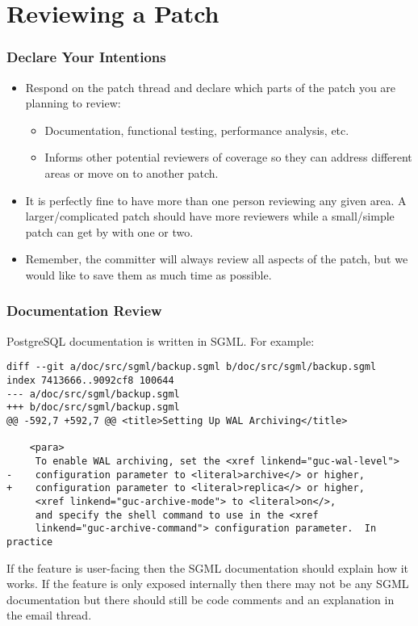 \section{Reviewing a Patch}

\begin{frame}
    \frametitle{Declare Your Intentions}

    \begin{itemize}
        \item Respond on the patch thread and declare which parts of the patch you are planning to review:

        \begin{itemize}
            \item Documentation, functional testing, performance analysis, etc.\pause
            \item Informs other potential reviewers of coverage so they can address different areas or move on to another patch.\pause
        \end{itemize}

        \item It is perfectly fine to have more than one person reviewing any given area.  A larger/complicated patch should have more reviewers while a small/simple patch can get by with one or two.\pause

        \item Remember, the committer will always review all aspects of the patch, but we would like to save them as much time as possible.
    \end{itemize}
\end{frame}

\begin{frame}[fragile]
    \frametitle{Documentation Review}

    PostgreSQL documentation is written in SGML. For example:
    \vspace{1em}

    \begin{lstlisting}
diff --git a/doc/src/sgml/backup.sgml b/doc/src/sgml/backup.sgml
index 7413666..9092cf8 100644
--- a/doc/src/sgml/backup.sgml
+++ b/doc/src/sgml/backup.sgml
@@ -592,7 +592,7 @@ <title>Setting Up WAL Archiving</title>

    <para>
     To enable WAL archiving, set the <xref linkend="guc-wal-level">
-    configuration parameter to <literal>archive</> or higher,
+    configuration parameter to <literal>replica</> or higher,
     <xref linkend="guc-archive-mode"> to <literal>on</>,
     and specify the shell command to use in the <xref
     linkend="guc-archive-command"> configuration parameter.  In practice
    \end{lstlisting}
    \vspace{1em}
    If the feature is user-facing then the SGML documentation should explain how it works.  If the feature is only exposed internally then there may not be any SGML documentation but there should still be code comments and an explanation in the email thread.
\end{frame}

